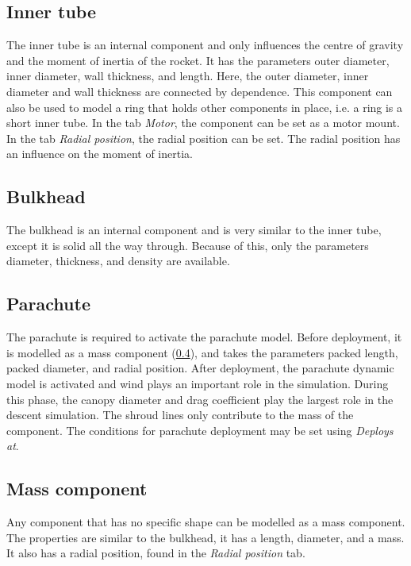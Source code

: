 \documentclass[11pt, a4paper]{article}
\begin{document}
\subsection{Inner tube}

The inner tube is an internal component and only influences the centre of gravity and the moment of inertia of the rocket. It has the parameters outer diameter, inner diameter, wall thickness, and length. Here, the outer diameter, inner diameter and wall thickness are connected by dependence. This component can also be used to model a ring that holds other components in place, i.e. a ring is a short inner tube. In the tab \emph{Motor}, the component can be set as a motor mount. In the tab \emph{Radial position}, the radial position can be set. The radial position has an influence on the moment of inertia.

\subsection{Bulkhead}

The bulkhead is an internal component and is very similar to the inner tube, except it is solid all the way through. Because of this, only the parameters diameter, thickness, and density are available.

\subsection{Parachute}

The parachute is required to activate the parachute model. Before deployment, it is modelled as a mass component (\cref{subsec:masscomp}), and takes the parameters packed length, packed diameter, and radial position. After deployment, the parachute dynamic model is activated and wind plays an important role in the simulation. During this phase, the canopy diameter and drag coefficient play the largest role in the descent simulation. The shroud lines only contribute to the mass of the component. The conditions for parachute deployment may be set using \emph{Deploys at}.

\subsection{Mass component} \label{subsec:masscomp}

Any component that has no specific shape can be modelled as a mass component. The properties are similar to the bulkhead, it has a length, diameter, and a mass. It also has a radial position, found in the \emph{Radial position} tab.
\end{document}
